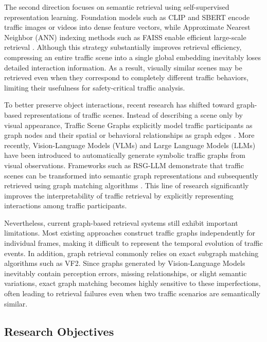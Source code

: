 \documentclass[a4paper, 11pt]{article} %
\begin{document}
The second direction focuses on semantic retrieval using self-supervised representation learning. Foundation models such as CLIP and SBERT encode traffic images or videos into dense feature vectors, while Approximate Nearest Neighbor (ANN) indexing methods such as FAISS enable efficient large-scale retrieval \cite{radford2021learning,reimers2019sentence,douze2024faiss}. Although this strategy substantially improves retrieval efficiency, compressing an entire traffic scene into a single global embedding inevitably loses detailed interaction information. As a result, visually similar scenes may be retrieved even when they correspond to completely different traffic behaviors, limiting their usefulness for safety-critical traffic analysis.

To better preserve object interactions, recent research has shifted toward graph-based representations of traffic scenes. Instead of describing a scene only by visual appearance, Traffic Scene Graphs explicitly model traffic participants as graph nodes and their spatial or behavioral relationships as graph edges \cite{zhou2024hktsg,malawade2022roadscene2vec}. More recently, Vision-Language Models (VLMs) and Large Language Models (LLMs) have been introduced to automatically generate symbolic traffic graphs from visual observations. Frameworks such as RSG-LLM demonstrate that traffic scenes can be transformed into semantic graph representations and subsequently retrieved using graph matching algorithms \cite{tian2025query}. This line of research significantly improves the interpretability of traffic retrieval by explicitly representing interactions among traffic participants.

Nevertheless, current graph-based retrieval systems still exhibit important limitations. Most existing approaches construct traffic graphs independently for individual frames, making it difficult to represent the temporal evolution of traffic events. In addition, graph retrieval commonly relies on exact subgraph matching algorithms such as VF2. Since graphs generated by Vision-Language Models inevitably contain perception errors, missing relationships, or slight semantic variations, exact graph matching becomes highly sensitive to these imperfections, often leading to retrieval failures even when two traffic scenarios are semantically similar.

\subsection{Research Objectives}
\end{document}
